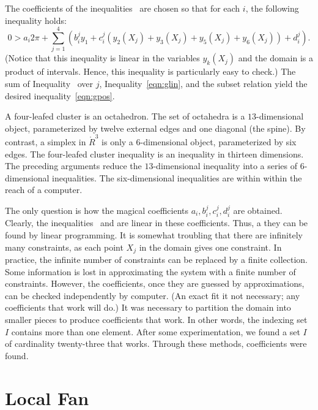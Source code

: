 The coefficients of the inequalities~
are chosen so that for each $i$, the following inequality holds:
\begin{equation}\label{eqn:glin} 
0 > a_i 2\pi + 
\sum_{j=1}^4 (b_i^j y_1 +  c_i^j (y_2(X_j)+y_3(X_j)+y_5(X_j)+y_6(X_j)) + d_i^j).
\end{equation}
(Notice that this inequality is linear in the variables $y_k(X_j)$ and
the domain is a product of intervals.  Hence, this inequality is
particularly easy to check.)  The sum of Inequality~ over $j$, Inequality~\ref{eqn:glin},
and the subset relation yield the desired inequality~\ref{eqn:gpos}.

A four-leafed cluster is an octahedron.  The set of octahedra is a
$13$-dimensional object, parameterized by twelve external edges and one
diagonal (the spine).  By contrast, a simplex in $\ring{R}^3$ is only
a $6$-dimensional object, parameterized by six edges.  The four-leafed
cluster inequality is an inequality in thirteen dimensions.  The preceding
arguments reduce the $13$-dimensional inequality into a series of
$6$-dimensional inequalities.  The six-dimensional inequalities are
within within the reach of a computer.

The only question is how the magical coefficients
$a_i,b_i^j,c_i^j,d_i^j$ are obtained.  Clearly, the
inequalities~ and  are linear in these
coefficients.  Thus, a they can be found by linear programming.  It is
somewhat troubling that there are infinitely many constraints, as each
point $X_j$ in the domain gives one constraint.  In practice, the
infinite number of constraints can be replaced by a finite collection.
Some information is lost in approximating the system with a finite
number of constraints.  However, the coefficients, once they are
guessed by approximations, can be checked independently by computer.
(An exact fit it not necessary; any coefficients that work will do.)
It was necessary to partition the domain into smaller pieces to
produce coefficients that work.  In other words, the indexing set $I$
contains more than one element.  After some experimentation, we found
a set $I$ of cardinality twenty-three that works.  Through these methods,
coefficients were found.



\chapter{Local Fan}

